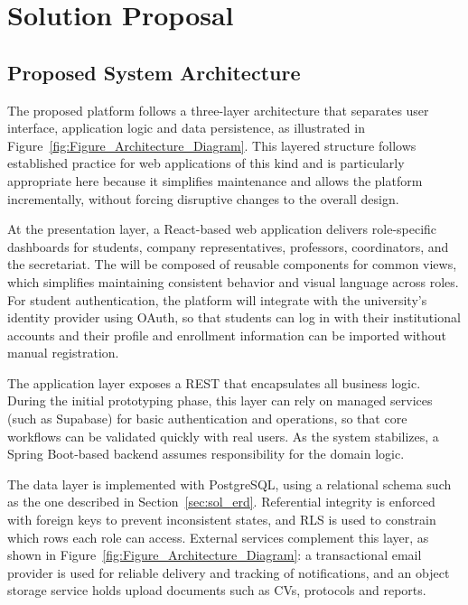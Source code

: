 %

\chapter{Solution Proposal}
\label{cha:solution_proposal}


\epigraphfontsize{\small\itshape}
\setlength\epigraphwidth{12.5cm}
\setlength\epigraphrule{0pt}

\section{Proposed System Architecture}
\label{sec:sol_architecture}
\ntindex[Template]{}
    {
        The proposed platform follows a three-layer architecture that separates user interface, application logic and data persistence, 
        as illustrated in Figure~\ref{fig:Figure_Architecture_Diagram}.
        This layered structure follows established practice for web applications of this kind and is particularly appropriate here 
        because it simplifies maintenance and allows the platform incrementally, 
        without forcing disruptive changes to the overall design.
    }
    {
        At the presentation layer, a React-based web application delivers role-specific dashboards for students, company representatives, professors, coordinators, and the secretariat.
        The  will be composed of reusable components for common views, which simplifies maintaining consistent behavior and visual language across roles.
        For student authentication, the platform will integrate with the university's identity provider using OAuth, so that students
        can log in with their institutional accounts and their profile and enrollment information can be imported without manual registration.
    
    }

    {
        The application layer exposes a REST  that encapsulates all business logic. 
        During the initial prototyping phase, this layer can rely on managed services (such as Supabase) for basic authentication
        and  operations, so that core workflows can be validated quickly with real users.
        As the system stabilizes, a Spring Boot-based backend assumes responsibility for the domain logic.
    }

    {
        The data layer is implemented with PostgreSQL, using a relational schema such as the one described in Section~\ref{sec:sol_erd}.
        Referential integrity is enforced with foreign keys to prevent inconsistent states, and \gls{RLS} is used to constrain which rows each role can access.
        External services complement this layer, as shown in Figure~\ref{fig:Figure_Architecture_Diagram}: a transactional email provider is used for reliable delivery and tracking of notifications, and an object storage
        service holds upload documents such as CVs, protocols and reports. 
    }


